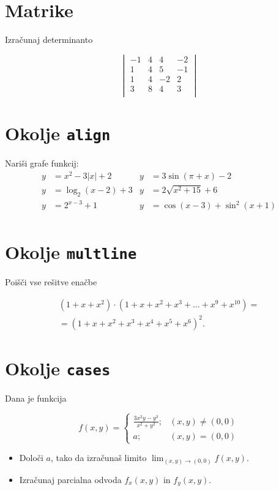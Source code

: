 \documentclass[a4paper,12pt]{article}
\begin{document}
\section*{Matrike}
Izračunaj determinanto

   \[\begin{vmatrix}
      -1 & 4 & 4 & -2 \\
      1 & 4 & 5 & -1 \\
      1 & 4 & -2 & 2 \\
      3 & 8 & 4 & 3 \\
      \end{vmatrix}\]

\section*{Okolje \texttt{align}}
Nariši grafe funkcij:
\begin{align*}
   y &= x^2 - 3|x| + 2   & y &= 3 \sin(\pi+x) - 2\\
   y &= \log_2(x-2) + 3  & y &= 2 \sqrt{x^2+15} + 6\\
   y &= 2^{x-3} + 1      & y &= \cos(x-3) + \sin^2(x+1)\\
\end{align*}


\section*{Okolje \texttt{multline}}
Poišči vse rešitve enačbe

\begin{multline*}
   (1+x+x^2) \cdot (1+x+x^2+x^3+\ldots+x^9+x^{10}) =\\
   =(1+x+x^2+x^3+x^4+x^5+x^6)^2.
\end{multline*}


\section*{Okolje \texttt{cases}}
Dana je funkcija
   
\[
f(x,y)=\begin{cases}
   \frac{3x^2y-y^3}{x^2+y^2};&(x,y)\ne(0,0)\\
   a;&(x,y)=(0,0)
\end{cases}
\]

\begin{itemize}
\item Določi \(a\), tako da izračunaš limito \( \lim_{(x,y)\to(0,0)} f(x,y) \).
\item Izračunaj parcialna odvoda \(f_x(x,y)\) in \(f_y(x,y)\).
\end{itemize}
\end{document}
